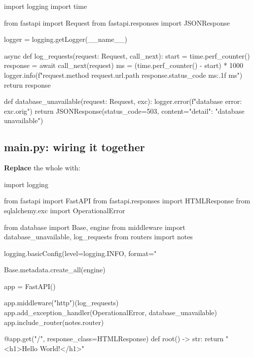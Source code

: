 \begin{py}
import logging
import time

from fastapi import Request
from fastapi.responses import JSONResponse

logger = logging.getLogger(__name__)


async def log_requests(request: Request, call_next):
	start = time.perf_counter()
	response = await call_next(request)
	ms = (time.perf_counter() - start) * 1000
	logger.info(f"{request.method} {request.url.path} {response.status_code} {ms:.1f} ms")
	return response


def database_unavailable(request: Request, exc):
	logger.error(f"database error: {exc.orig}")
	return JSONResponse(status_code=503, content={"detail": "database unavailable"})
\end{py}

\subsection{main.py: wiring it together}

\textbf{Replace} the whole  with:

\begin{py}
import logging

from fastapi import FastAPI
from fastapi.responses import HTMLResponse
from sqlalchemy.exc import OperationalError

from database import Base, engine
from middleware import database_unavailable, log_requests
from routers import notes

logging.basicConfig(level=logging.INFO, format="%

Base.metadata.create_all(engine)

app = FastAPI()

app.middleware("http")(log_requests)
app.add_exception_handler(OperationalError, database_unavailable)
app.include_router(notes.router)


@app.get("/", response_class=HTMLResponse)
def root() -> str:
	return "<h1>Hello World!</h1>"
\end{py}

